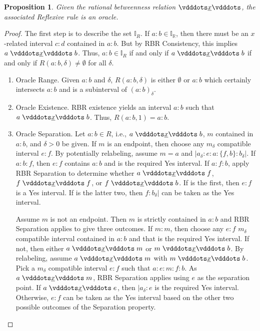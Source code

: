 \documentclass[12pt]{article}
\newtheorem{proposition}{Proposition}[section]
\begin{document}
\begin{proposition}
    Given the rational betweenness relation $\xrel$, the associated Reflexive rule is an oracle. 
\end{proposition}

\begin{proof}

    The first step is to describe the set $\mathbb{I}_R$. If $a:b \in \mathbb{I_R}$, then there must be an $x$-related interval $c:d$ contained in $a:b$. But by RBR Consistency, this implies $a \xrel b$. Thus, $a:b \in \mathbb{I}_R$ if and only if $a \xrel b$ if and only if $R(a:b, \delta) \neq \emptyset$ for all $\delta$. 

    \begin{enumerate}
        \item Oracle Range. Given $a:b$ and $\delta$, $R(a:b, \delta)$ is either $\emptyset$ or $a:b$ which certainly intersects $a:b$ and is a subinterval  of $(a:b)_\delta$.
        \item Oracle Existence. RBR existence yields an interval $a:b$ such that $a \xrel b$. Thus, $R(a:b, 1) = a:b$. 
        \item Oracle Separation. Let $a:b \in R$, i.e., $a \xrel b$, $m$ contained in $a:b$, and $\delta >0$ be given. If $m$ is an endpoint, then choose any $m_\delta$ compatible interval $e:f$. By potentially relabeling, assume $m =a$ and $|a_\delta:e:a:\{f,b\}:b_\delta|$. If $a:b:f$, then $e:f$ contains $a:b$ and is the required Yes interval. If $a:f:b$, apply RBR Separation to determine whether $a \xrel f$, $f \xrel f$, or $f \xrel b$. If is the first, then $e:f$ is a Yes interval. If is the latter two, then $f:b_\delta|$ can be taken as the Yes interval. 

        Assume $m$ is not an endpoint. Then $m$ is strictly contained in $a:b$ and RBR Separation applies to give three outcomes. If $m:m$, then choose any $e:f$ $m_\delta$ compatible interval contained in $a:b$ and that is the required Yes interval. If not, then either $a \xrel m$ or $m \xrel b$. By relabeling, assume $a \xrel m$ with \sout{$m \xrel b$}. Pick a $m_\delta$ compatible interval $e:f$ such that $a:e:m:f:b$. As $a \xrel m$, RBR Separation applies using $e$ as the separation point. If $a \xrel e$, then $|a_\delta:e$ is the required Yes interval. Otherwise, $e:f$ can be taken as the Yes interval based on the other two possible outcomes of the Separation property. 


\end{enumerate}
\end{proof}
\end{document}

